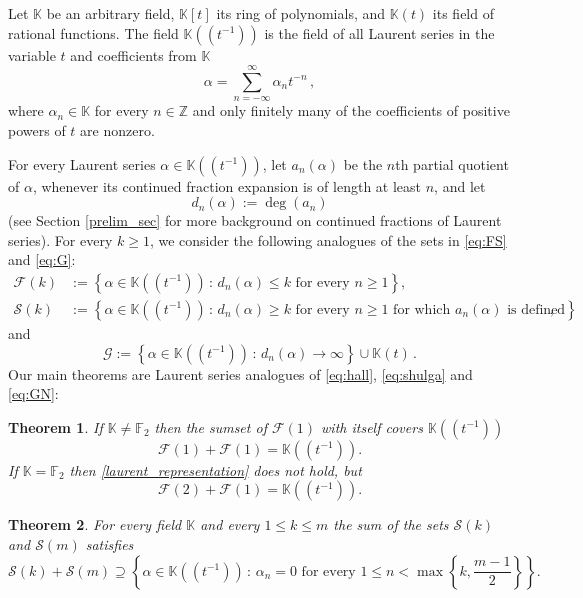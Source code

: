 \documentclass[a4paper,12pt]{article}
\newtheorem{thm}{Theorem}
\def\bbf{\mathbb{F}}
\def\fq{\bbk}
\def\ft{\fq[t]}
\def\ftt{\fq(t)}
\def\fttt{\fq\!\left(\!\left(t^{-1}\right)\!\right)}
\def\sep{\,:\,}
\def\defeq{:=}
\def\bbz{\mathbb{Z}}
\def\bbk{\mathbb{K}}
\def\calf{\mathcal{F}}
\def\cals{\mathcal{S}}
\def\calg{\mathcal{G}}
\def\defeq{:=}
\newcommand{\DG}[1]{
\begin{tcolorbox}[colback=green,colframe=black]
   {\textbf{DG: #1}}
\end{tcolorbox}
}
\newcommand{\EN}[1]{
\begin{tcolorbox}[colback=orange,colframe=black]
   {\textbf{EN: #1}}
\end{tcolorbox}
}
\begin{document}
Let $\fq$ be an arbitrary field, $\ft$ its ring of polynomials, and $\ftt$ its field of rational functions. The field $\fttt$ is the field of all Laurent series in the variable $t$ and coefficients from $\fq$
\begin{equation}\label{eq:theta}
\alpha = \sum_{n=-\infty}^\infty \alpha_n t^{-n}\,,
\end{equation}
where $\alpha_n\in\fq$ for every $n\in\bbz$ and only finitely many of the coefficients of positive powers of $t$ are nonzero. 

For every Laurent series $\alpha\in\fttt$, let $a_n(\alpha)$ be the $n$th partial quotient of $\alpha$, whenever its continued fraction expansion is of length 
at least $n$, and let 
$$d_n(\alpha)\defeq\deg\left(a_n\right)$$
(see Section \ref{prelim_sec} for more background on continued fractions of Laurent series). For every $k\geq1$, we consider the following analogues of the sets in \eqref{eq:FS} and \eqref{eq:G}:
\begin{align*}
\calf(k)&\defeq\left\{\alpha\in\fttt\sep d_n(\alpha)\le k \textrm{ for every $n\geq1$}\right\},\\
\cals(k)&\defeq\left\{\alpha\in\fttt\sep d_n(\alpha)\ge k \textrm{ for every $n\geq1$ for which $a_n(\alpha)$ is defined}\right\},
\end{align*}
and
\begin{equation}
    \calg\defeq\left\{\alpha\in\fttt\sep d_n(\alpha)\to\infty\right\}\cup\ftt\,.
\end{equation}
Our main theorems are Laurent series analogues of \eqref{eq:hall}, \eqref{eq:shulga} and \eqref{eq:GN}:
\begin{thm}
\label{hall_thm}
If $\fq\neq\bbf_2$ then the sumset of $\calf(1)$ with itself covers $\fttt$
\begin{equation}
\label{laurent_representation}
\calf(1)+\calf(1)=\fttt.
\end{equation}
If $\fq=\bbf_2$ then \eqref{laurent_representation} does not hold, but
\begin{equation}
\label{laurent_representation21}
\calf(2)+\calf(1)=\fttt.
\end{equation}
\end{thm}

\begin{thm}\label{thm:S_analogue}
For every field $\fq$ and every $1\le k\leq m$ the sum of the sets $\cals(k)$ and $\cals(m)$ satisfies
\begin{equation*}%
\cals(k)+\cals(m) \supseteq \left\{\alpha\in\fttt\sep\alpha_n=0 \textrm{ for every $1\leq n < \max\left\{k,\frac{m-1}{2}\right\}$}\right\}.
\end{equation*}
\end{thm}
\end{document}
